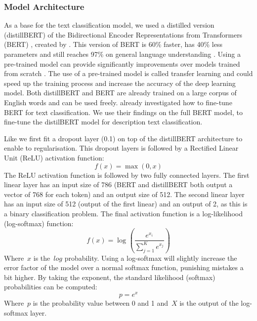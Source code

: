 \documentclass[a4paper, 12pt, oneside]{book} %
\begin{document}
\subsubsection{Model Architecture} \label{par:Architecture}
As a base for the text classification model, we used a distilled version (distillBERT) of the Bidirectional Encoder Representations from Transformers (BERT) \autocite{devlin_bert_2019}, created by \textcite{sanh_distilbert_2020}. 
This version of BERT is 60\% faster, has 40\% less parameters and still reaches 97\% on general language understanding \autocite{sanh_distilbert_2020}.
Using a pre-trained model can provide significantly improvements over models trained from scratch \autocite{mikolov_distributed_2013}.
The use of a pre-trained model is called transfer learning and could speed up the training process and increase the accuracy of the deep learning model.
Both distillBERT and BERT are already trained on a large corpus of English words and can be used freely.
\textcite{sun_how_2020} already investigated how to fine-tune BERT for text classification.
We use their findings on the full BERT model, to fine-tune the distilBERT model for description text classification.

Like \textcite{sun_how_2020} we first fit a dropout layer (0.1) on top of the distillBERT architecture to enable to regularisation.
This dropout layers is followed by a Rectified Linear Unit (ReLU) activation function:
\begin{equation} \label{ReLU}
    f(x) = \max(0, x)
\end{equation}
The ReLU activation function is followed by two fully connected layers.
The first linear layer has an input size of 786 (BERT and distillBERT both output a vector of 768 for each token) and an output size of 512.
The second linear layer has an input size of 512 (output of the first linear) and an output of 2, as this is a binary classification problem.
The final activation function is a log-likelihood (log-softmax) function:
\begin{equation} \label{eq:logsoftmax}
    f(x) = \log_{}(\frac{e^{x_i}}{\sum_{j=1}^K e^{x_j}})
\end{equation}
Where~$x$ is the~$log$ probability.
Using a log-softmax will slightly increase the error factor of the model over a normal softmax function, punishing mistakes a bit higher.
By taking the exponent, the standard likelihood (softmax) probabilities can be computed:
\begin{equation}
    p = e^{x} 
\end{equation}
Where~$p$ is the probability value between 0 and 1 and~$X$ is the output of the log-softmax layer.
\end{document}
